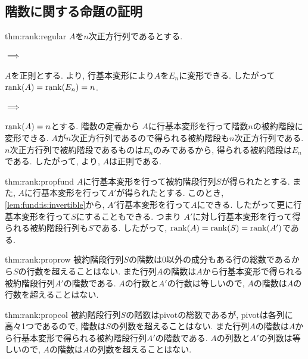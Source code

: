 \subsection{階数に関する命題の証明}
\begin{proofof}{thm:rank:regular}
  $A$を$n$次正方行列であるとする.
  \paragraph{$\implies$}
  $A$を正則とする.
  より,
  行基本変形により$A$を$E_n$に変形できる.
  したがって$\operatorname{rank}(A)=\operatorname{rank}(E_n)=n$.
  \paragraph{$\implies$}
  $\operatorname{rank}(A)=n$とする.
  階数の定義から
  $A$に行基本変形を行って階数$n$の被約階段に変形できる.
  $A$が$n$次正方行列であるので得られる被約階段も$n$次正方行列である.
  $n$次正方行列で被約階段であるものは$E_n$のみであるから,
  得られる被約階段は$E_n$である.
  したがって,
  より,
  $A$は正則である.
\end{proofof}

\begin{proofof*}{thm:rank:prop}{fund}
  $A$に行基本変形を行って被約階段行列$S$が得られたとする.
  また, $A$に行基本変形を行って$A'$が得られたとする.
  このとき,
  \cref{lem:fund:is:invertible}から, 
  $A'$行基本変形を行って$A$にできる.
  したがって更に行基本変形を行って$S$にすることもできる.
  つまり
  $A'$に対し行基本変形を行って得られる被約階段行列も$S$である.
  したがって, $\operatorname{rank}(A)=\operatorname{rank}(S)=\operatorname{rank}(A')$である.
\end{proofof*}

\begin{proofof*}{thm:rank:prop}{row}
  被約階段行列$S$の階数は$0$以外の成分もある行の総数であるから$S$の行数を超えることはない.
  また行列$A$の階数は$A$から行基本変形で得られる被約階段行列$A'$の階数である.
  $A$の行数と$A'$の行数は等しいので, $A$の階数は$A$の行数を超えることはない.
\end{proofof*}
\begin{proofof*}{thm:rank:prop}{col}
  被約階段行列$S$の階数はpivotの総数であるが,
  pivotは各列に高々1つであるので, 階数は$S$の列数を超えることはない.
  また行列$A$の階数は$A$から行基本変形で得られる被約階段行列$A'$の階数である.
  $A$の列数と$A'$の列数は等しいので, $A$の階数は$A$の列数を超えることはない.
\end{proofof*}


